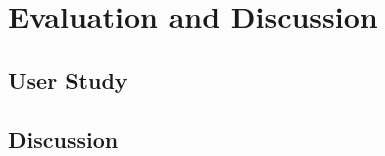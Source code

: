 \chapter{Evaluation and Discussion}\label{sec-eval}

\section{User Study}

\section{Discussion}

%
%
%
